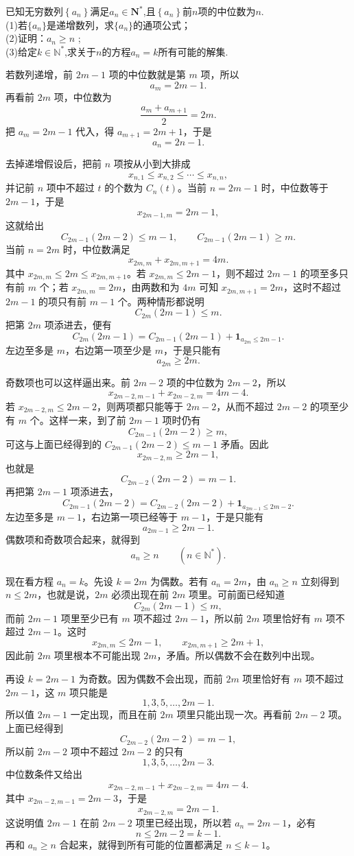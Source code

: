 \begin{example}
已知无穷数列$\left\{a_n\right\}$满足$a_n\in\mathbf{N}^*$,且$\left\{a_n\right\}$前$n$项的中位数为$n.$\\
(1)若$\{a_n\}$是递增数列，求$\{a_n\}$的通项公式；\\
(2)证明：$a_n\geqslant n$ ;\\
(3)给定$k\in\mathbb{N}^*$,求关于$n$的方程$a_n=k$所有可能的解集.
\end{example}
\begin{solution}
若数列递增，前 $2m-1$ 项的中位数就是第 $m$ 项，所以
\[
a_m=2m-1.
\]
再看前 $2m$ 项，中位数为
\[
\frac{a_m+a_{m+1}}{2}=2m.
\]
把 $a_m=2m-1$ 代入，得 $a_{m+1}=2m+1$，于是
\[
a_n=2n-1.
\]

去掉递增假设后，把前 $n$ 项按从小到大排成
\[
x_{n,1}\le x_{n,2}\le \cdots \le x_{n,n},
\]
并记前 $n$ 项中不超过 $t$ 的个数为 $C_n(t)$。当前 $n=2m-1$ 时，中位数等于 $2m-1$，于是
\[
x_{2m-1,m}=2m-1,
\]
这就给出
\[
C_{2m-1}(2m-2)\le m-1,\qquad C_{2m-1}(2m-1)\ge m.
\]
当前 $n=2m$ 时，中位数满足
\[
x_{2m,m}+x_{2m,m+1}=4m.
\]
其中 $x_{2m,m}\le 2m\le x_{2m,m+1}$。若 $x_{2m,m}\le 2m-1$，则不超过 $2m-1$ 的项至多只有前 $m$ 个；若 $x_{2m,m}=2m$，由两数和为 $4m$ 可知 $x_{2m,m+1}=2m$，这时不超过 $2m-1$ 的项只有前 $m-1$ 个。两种情形都说明
\[
C_{2m}(2m-1)\le m.
\]
把第 $2m$ 项添进去，便有
\[
C_{2m}(2m-1)=C_{2m-1}(2m-1)+\mathbf 1_{a_{2m}\le 2m-1}.
\]
左边至多是 $m$，右边第一项至少是 $m$，于是只能有
\[
a_{2m}\ge 2m.
\]

奇数项也可以这样逼出来。前 $2m-2$ 项的中位数为 $2m-2$，所以
\[
x_{2m-2,m-1}+x_{2m-2,m}=4m-4.
\]
若 $x_{2m-2,m}\le 2m-2$，则两项都只能等于 $2m-2$，从而不超过 $2m-2$ 的项至少有 $m$ 个。这样一来，到了前 $2m-1$ 项时仍有
\[
C_{2m-1}(2m-2)\ge m,
\]
可这与上面已经得到的 $C_{2m-1}(2m-2)\le m-1$ 矛盾。因此
\[
x_{2m-2,m}\ge 2m-1,
\]
也就是
\[
C_{2m-2}(2m-2)=m-1.
\]
再把第 $2m-1$ 项添进去，
\[
C_{2m-1}(2m-2)=C_{2m-2}(2m-2)+\mathbf 1_{a_{2m-1}\le 2m-2}.
\]
左边至多是 $m-1$，右边第一项已经等于 $m-1$，于是只能有
\[
a_{2m-1}\ge 2m-1.
\]
偶数项和奇数项合起来，就得到
\[
a_n\ge n\qquad (n\in\mathbb N^*).
\]

现在看方程 $a_n=k$。先设 $k=2m$ 为偶数。若有 $a_n=2m$，由 $a_n\ge n$ 立刻得到 $n\le 2m$，也就是说，$2m$ 必须出现在前 $2m$ 项里。可前面已经知道
\[
C_{2m}(2m-1)\le m,
\]
而前 $2m-1$ 项里至少已有 $m$ 项不超过 $2m-1$，所以前 $2m$ 项里恰好有 $m$ 项不超过 $2m-1$。这时
\[
x_{2m,m}\le 2m-1,\qquad x_{2m,m+1}\ge 2m+1,
\]
因此前 $2m$ 项里根本不可能出现 $2m$，矛盾。所以偶数不会在数列中出现。

再设 $k=2m-1$ 为奇数。因为偶数不会出现，而前 $2m$ 项里恰好有 $m$ 项不超过 $2m-1$，这 $m$ 项只能是
\[
1,3,5,\dots,2m-1.
\]
所以值 $2m-1$ 一定出现，而且在前 $2m$ 项里只能出现一次。再看前 $2m-2$ 项。上面已经得到
\[
C_{2m-2}(2m-2)=m-1,
\]
所以前 $2m-2$ 项中不超过 $2m-2$ 的只有
\[
1,3,5,\dots,2m-3.
\]
中位数条件又给出
\[
x_{2m-2,m-1}+x_{2m-2,m}=4m-4.
\]
其中 $x_{2m-2,m-1}=2m-3$，于是
\[
x_{2m-2,m}=2m-1.
\]
这说明值 $2m-1$ 在前 $2m-2$ 项里已经出现，所以若 $a_n=2m-1$，必有
\[
n\le 2m-2=k-1.
\]
再和 $a_n\ge n$ 合起来，就得到所有可能的位置都满足 $n\le k-1$。


\end{solution}
